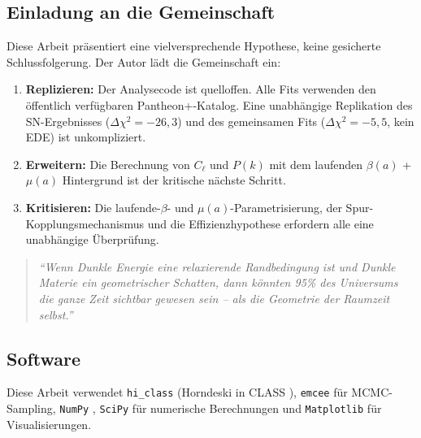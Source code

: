\documentclass[aps,prd,twocolumn,superscriptaddress,nofootinbib]{revtex4-2}
\begin{document}
\subsection{Einladung an die Gemeinschaft}

Diese Arbeit pr\"asentiert eine vielversprechende Hypothese, keine gesicherte Schlussfolgerung. Der Autor l\"adt die Gemeinschaft ein:
\begin{enumerate}
\item \textbf{Replizieren:} Der Analysecode ist quelloffen. Alle Fits verwenden den \"offentlich verf\"ugbaren Pantheon+-Katalog. Eine unabh\"angige Replikation des SN-Ergebnisses ($\Delta\chi^2 = -26{,}3$) und des gemeinsamen Fits ($\Delta\chi^2 = -5{,}5$, kein EDE) ist unkompliziert.
\item \textbf{Erweitern:} Die Berechnung von $C_\ell$ und $P(k)$ mit dem laufenden $\beta(a)$ + $\mu(a)$ Hintergrund ist der kritische n\"achste Schritt.
\item \textbf{Kritisieren:} Die laufende-$\beta$- und $\mu(a)$-Parametrisierung, der Spur-Kopplungsmechanismus und die Effizienzhypothese erfordern alle eine unabh\"angige \"Uberpr\"ufung.
\end{enumerate}

\begin{quote}
\textit{"`Wenn Dunkle Energie eine relaxierende Randbedingung ist und Dunkle Materie ein geometrischer Schatten, dann k\"onnten 95\% des Universums die ganze Zeit sichtbar gewesen sein -- als die Geometrie der Raumzeit selbst."'}
\end{quote}

\subsection*{Software}

Diese Arbeit verwendet \texttt{hi\_class} \cite{Zumalacarregui2017} (Horndeski in CLASS \cite{Blas2011}), \texttt{emcee} \cite{ForemanMackey2013} f\"ur MCMC-Sampling, \texttt{NumPy} \cite{Harris2020}, \texttt{SciPy} \cite{Virtanen2020} f\"ur numerische Berechnungen und \texttt{Matplotlib} \cite{Hunter2007} f\"ur Visualisierungen.
\end{document}
